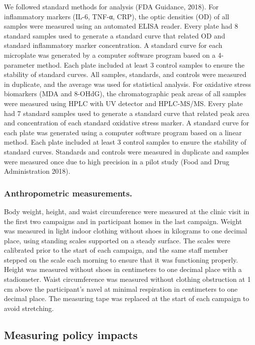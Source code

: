 \documentclass[
  letterpaper,
  DIV=11,
  numbers=noendperiod]{scrartcl}
\begin{document}
We followed standard methods for analysis (FDA Guidance, 2018). For
inflammatory markers (IL-6, TNF-α, CRP), the optic densities (OD) of all
samples were measured using an automated ELISA reader. Every plate had 8
standard samples used to generate a standard curve that related OD and
standard inflammatory marker concentration. A standard curve for each
microplate was generated by a computer software program based on a
4-parameter method. Each plate included at least 3 control samples to
ensure the stability of standard curves. All samples, standards, and
controls were measured in duplicate, and the average was used for
statistical analysis. For oxidative stress biomarkers (MDA and 8-OHdG),
the chromatographic peak areas of all samples were measured using HPLC
with UV detector and HPLC-MS/MS. Every plate had 7 standard samples used
to generate a standard curve that related peak area and concentration of
each standard oxidative stress marker. A standard curve for each plate
was generated using a computer software program based on a linear
method. Each plate included at least 3 control samples to ensure the
stability of standard curves. Standards and controls were measured in
duplicate and samples were measured once due to high precision in a
pilot study (Food and Drug Administration 2018).

\hypertarget{anthropometric-measurements.}{%
\subsubsection{Anthropometric
measurements.}\label{anthropometric-measurements.}}

Body weight, height, and waist circumference were measured at the clinic
visit in the first two campaigns and in participant homes in the last
campaign. Weight was measured in light indoor clothing without shoes in
kilograms to one decimal place, using standing scales supported on a
steady surface. The scales were calibrated prior to the start of each
campaign, and the same staff member stepped on the scale each morning to
ensure that it was functioning properly. Height was measured without
shoes in centimeters to one decimal place with a stadiometer. Waist
circumference was measured without clothing obstruction at 1 cm above
the participant's navel at minimal respiration in centimeters to one
decimal place. The measuring tape was replaced at the start of each
campaign to avoid stretching.

\hypertarget{measuring-policy-impacts}{%
\subsection{Measuring policy impacts}\label{measuring-policy-impacts}}
\end{document}
